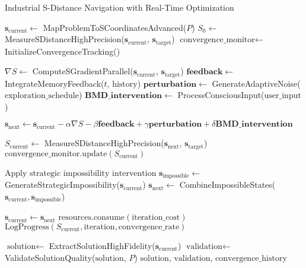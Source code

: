 \documentclass[11pt]{article}
\theoremstyle{definition}
\theoremstyle{remark}
\begin{document}
\begin{algorithm}[H]
\caption{Industrial S-Distance Navigation with Real-Time Optimization}
\label{alg:industrial_s_navigation}
\begin{algorithmic}[1]
    \State $\mathbf{s}_{\text{current}} \gets$ MapProblemToSCoordinatesAdvanced($P$)
    \State $S_0 \gets$ MeasureSDistanceHighPrecision($\mathbf{s}_{\text{current}}$, $\mathbf{s}_{\text{target}}$)
    \State $\text{convergence\_monitor} \gets$ InitializeConvergenceTracking()
    
        \State $\nabla S \gets$ ComputeSGradientParallel($\mathbf{s}_{\text{current}}$, $\mathbf{s}_{\text{target}}$)
        \State $\mathbf{feedback} \gets$ IntegrateMemoryFeedback($t$, $\text{history}$)
        \State $\mathbf{perturbation} \gets$ GenerateAdaptiveNoise($\text{exploration\_schedule}$)
        \State $\mathbf{BMD\_intervention} \gets$ ProcessConsciousInput($\text{user\_input}$)
        
        \State $\mathbf{s}_{\text{next}} \gets \mathbf{s}_{\text{current}} - \alpha \nabla S - \beta \mathbf{feedback} + \gamma \mathbf{perturbation} + \delta \mathbf{BMD\_intervention}$
        
        \State $S_{\text{current}} \gets$ MeasureSDistanceHighPrecision($\mathbf{s}_{\text{next}}$, $\mathbf{s}_{\text{target}}$)
        \State $\text{convergence\_monitor.update}(S_{\text{current}})$
        
            \State $\text{Apply strategic impossibility intervention}$
            \State $\mathbf{s}_{\text{impossible}} \gets$ GenerateStrategicImpossibility($\mathbf{s}_{\text{current}}$)
            \State $\mathbf{s}_{\text{next}} \gets$ CombineImpossibleStates($\mathbf{s}_{\text{current}}, \mathbf{s}_{\text{impossible}}$)
        \EndIf
        
        \State $\mathbf{s}_{\text{current}} \gets \mathbf{s}_{\text{next}}$
        \State $\text{resources.consume}(\text{iteration\_cost})$
        \State $\text{LogProgress}(S_{\text{current}}, \text{iteration}, \text{convergence\_rate})$
    \EndWhile
    
    \State $\text{solution} \gets$ ExtractSolutionHighFidelity($\mathbf{s}_{\text{current}}$)
    \State $\text{validation} \gets$ ValidateSolutionQuality($\text{solution}$, $P$)
    \State \Return $\text{solution}$, $\text{validation}$, $\text{convergence\_history}$
\EndProcedure
\end{algorithmic}
\end{algorithm}
\end{document}
